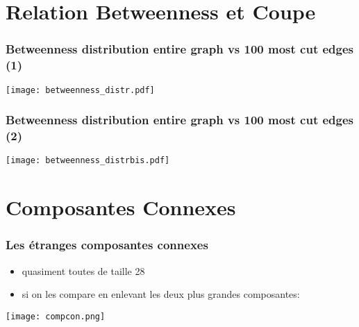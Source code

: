 \documentclass[aspectratio=169]{beamer}
\begin{document}
    \section{Relation Betweenness et Coupe}
    \begin{frame}
        \frametitle{Betweenness distribution entire graph vs 100 most cut edges (1)}
    
        \texttt{[image: betweenness\_distr.pdf]}
    
    \end{frame}

    \begin{frame}
        \frametitle{Betweenness distribution entire graph vs 100 most cut edges (2)}
    
        \texttt{[image: betweenness\_distrbis.pdf]}
    
    \end{frame}

    \section{Composantes Connexes}
    \begin{frame}
        \frametitle{Les étranges composantes connexes}
        \begin{itemize}
            \item quasiment toutes de taille 28
            \item si on les compare en enlevant les deux plus grandes composantes:
        \end{itemize}
        \texttt{[image: compcon.png]}
    \end{frame}
\end{document}
